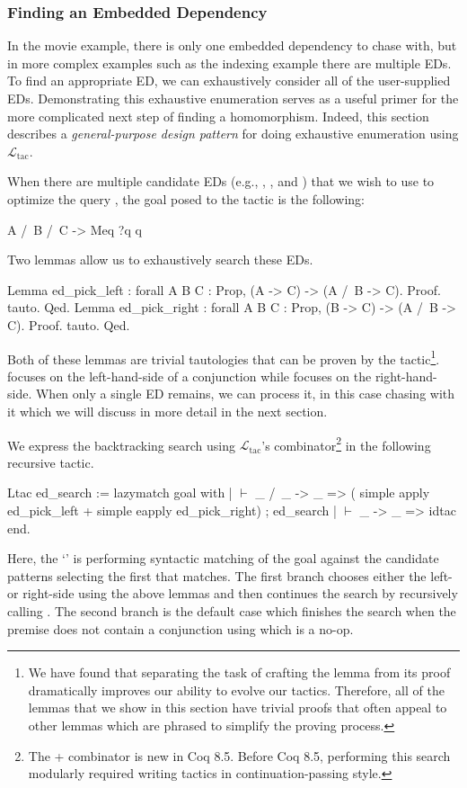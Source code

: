 \documentclass[preprint]{sigplanconf}
\newcommand{\ltac}[0]{\ensuremath{\mathcal{L}_{\mathrm{tac}}}}
\begin{document}

\subsubsection{Finding an Embedded Dependency}
\label{sec:traverse-ed}

In the movie example, there is only one embedded dependency to chase with, but in more complex examples such as the indexing example there are multiple EDs.
To find an appropriate ED, we can exhaustively consider all of the user-supplied EDs.
Demonstrating this exhaustive enumeration serves as a useful primer for the more complicated next step of finding a homomorphism.
Indeed, this section describes a \emph{general-purpose design pattern} for doing exhaustive enumeration using \ltac{}.

When there are multiple candidate EDs (e.g., , , and ) that we wish to use to optimize the query , the goal posed to the tactic is the following:
\begin{coq}
A /\ B /\ C -> Meq ?q q
\end{coq}

Two lemmas allow us to exhaustively search these EDs.
\begin{coq}
Lemma ed_pick_left : forall {A B C : Prop},
  (A -> C) -> (A /\ B -> C).
Proof. tauto. Qed.
Lemma ed_pick_right : forall {A B C : Prop},
  (B -> C) -> (A /\ B -> C).
Proof. tauto. Qed.
\end{coq}
Both of these lemmas are trivial tautologies that can be proven by the  tactic\footnote{We have found that separating the task of crafting the lemma from its proof dramatically improves our ability to evolve our tactics.
Therefore, all of the lemmas that we show in this section have trivial proofs that often appeal to other lemmas which are phrased to simplify the proving process.}.
 focuses on the left-hand-side of a conjunction while  focuses on the right-hand-side.
When only a single ED remains, we can process it, in this case chasing with it which we will discuss in more detail in the next section.

We express the backtracking search using \ltac's \coqe{+} combinator\footnote{The + combinator is new in Coq 8.5. Before Coq 8.5, performing this search modularly required writing tactics in continuation-passing style.} in the following recursive tactic.
\begin{coq}
Ltac ed_search :=
  lazymatch goal with
  | $\vdash$ _ /\ _ -> _ =>
    (  simple apply ed_pick_left
     + simple eapply ed_pick_right) ; ed_search
  | $\vdash$ _ -> _ => idtac
  end.
\end{coq}
Here, the `' is performing syntactic matching of the goal against the candidate patterns selecting the first that matches.
The first branch chooses either the left- or right-side using the above lemmas and then continues the search by recursively calling .
The second branch is the default case which finishes the search when the premise does not contain a conjunction using  which is a no-op.
\end{document}
